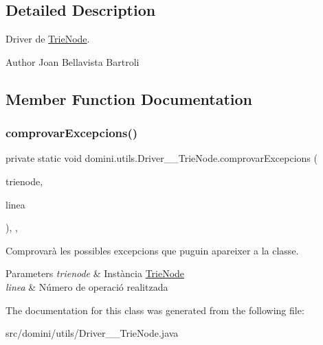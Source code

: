 \subsection{Detailed Description}
Driver de \hyperlink{classdomini_1_1utils_1_1TrieNode}{Trie\+Node}. 

\begin{DoxyAuthor}{Author}
Joan Bellavista Bartroli 
\end{DoxyAuthor}


\subsection{Member Function Documentation}
\mbox{\label{classdomini_1_1utils_1_1Driver____TrieNode_aa763a74162f647ee153c5cea01d371d0}} 
\subsubsection{\texorpdfstring{comprovar\+Excepcions()}{comprovarExcepcions()}}
{\footnotesize\ttfamily private static void domini.\+utils.\+Driver\+\_\+\+\_\+\+Trie\+Node.\+comprovar\+Excepcions (\begin{DoxyParamCaption}\item[{\hyperlink{classdomini_1_1utils_1_1TrieNode}{Trie\+Node}$<$ Byte $>$}]{trienode,  }\item[{String}]{linea }\end{DoxyParamCaption})\hspace{0.3cm}{\ttfamily [inline]}, {\ttfamily [static]}, {\ttfamily [private]}}



Comprovarà les possibles excepcions que puguin apareixer a la classe. 


\begin{DoxyParams}{Parameters}
{\em trienode} & Instància \hyperlink{classdomini_1_1utils_1_1TrieNode}{Trie\+Node} \\
\hline
{\em linea} & Número de operació realitzada \\
\hline
\end{DoxyParams}


The documentation for this class was generated from the following file\+:\begin{DoxyCompactItemize}
\item 
src/domini/utils/Driver\+\_\+\+\_\+\+Trie\+Node.\+java\end{DoxyCompactItemize}

